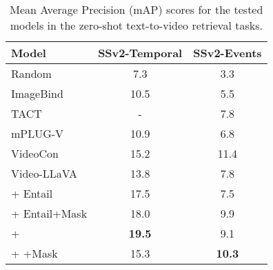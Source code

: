 
\begin{table}[!b]
\centering
\footnotesize
\begin{tabular}{@{}lcc@{}}
\toprule
Model        & SSv2-Temporal & SSv2-Events \\ \midrule
Random       & 7.3      & 3.3    \\
ImageBind \cite{girdhar2023imagebind}    & 10.5     & 5.5    \\
TACT \cite{bagad2023test}     & -  & 7.8 \\
mPLUG-V \cite{ye2023mplug} & 10.9 & 6.8 \\ 
VideoCon  \cite{bansal2024videocon}    & 15.2     & 11.4   \\ \midrule
Video-LLaVA  & 13.8     & 7.8    \\
+ Entail      & 17.5     & 7.5    \\
+ Entail+Mask &   18.0       &   9.9     \\
+ \method{}      & \textbf{19.5}     & 9.1    \\
+ \method{}+Mask  & 15.3     & \textbf{10.3}   \\ \midrule
\end{tabular}
\label{table:ssv}
\caption{Mean Average Precision (mAP) scores for the tested models in the zero-shot text-to-video retrieval tasks.}
\label{table:ssv2}
\end{table}


